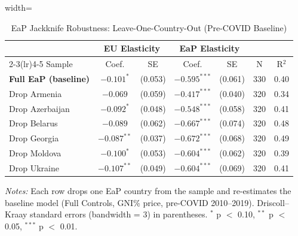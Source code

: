 \begin{table}[htbp]
\centering
\caption{EaP Jackknife Robustness: Leave-One-Country-Out (Pre-COVID Baseline)}
\label{tab:jackknife}
\begin{minipage}{\textwidth}
\begin{adjustbox}{width=\textwidth}
\scriptsize
\begin{tabular}{lcccccc}
\toprule
& \multicolumn{2}{c}{EU Elasticity} & \multicolumn{2}{c}{EaP Elasticity} & & \\
\cmidrule(lr){2-3}\cmidrule(lr){4-5}
Sample & Coef. & SE & Coef. & SE & N & R$^2$ \\
\midrule
\textbf{Full EaP (baseline)} & $-0.101^{*}$ & (0.053) & $-0.595^{***}$ & (0.061) & 330 & 0.40 \\
Drop Armenia & $-0.069$ & (0.059) & $-0.417^{***}$ & (0.040) & 320 & 0.34 \\
Drop Azerbaijan & $-0.092^{*}$ & (0.048) & $-0.548^{***}$ & (0.058) & 320 & 0.41 \\
Drop Belarus & $-0.089$ & (0.062) & $-0.667^{***}$ & (0.074) & 320 & 0.48 \\
Drop Georgia & $-0.087^{**}$ & (0.037) & $-0.672^{***}$ & (0.068) & 320 & 0.49 \\
Drop Moldova & $-0.100^{*}$ & (0.053) & $-0.604^{***}$ & (0.062) & 320 & 0.39 \\
Drop Ukraine & $-0.107^{**}$ & (0.049) & $-0.604^{***}$ & (0.069) & 320 & 0.41 \\
\bottomrule
\end{tabular}
\end{adjustbox}
\par\vspace{4pt}
\scriptsize
\textit{Notes:} Each row drops one EaP country from the sample and
re-estimates the baseline model (Full Controls, GNI\% price, pre-COVID 2010--2019).
Driscoll--Kraay standard errors (bandwidth = 3) in parentheses.
$^{*}$ p $<$ 0.10, $^{**}$ p $<$ 0.05, $^{***}$ p $<$ 0.01.
\end{minipage}
\end{table}
